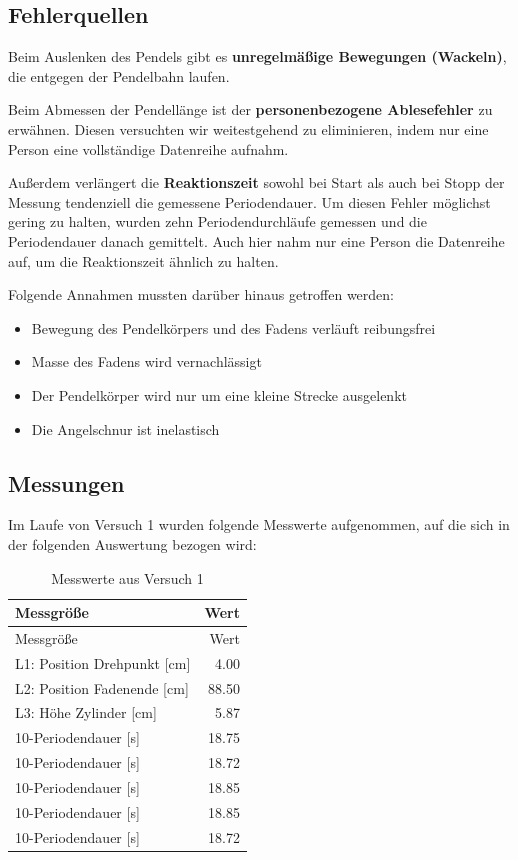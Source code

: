 \documentclass[
  9pt,
]{article}
\providecommand{\tightlist}{%
  \setlength{\itemsep}{0pt}\setlength{\parskip}{0pt}}
\begin{document}
\hypertarget{fehlerquellen}{%
\subsection{Fehlerquellen}\label{fehlerquellen}}

Beim Auslenken des Pendels gibt es \textbf{unregelmäßige Bewegungen
(Wackeln)}, die entgegen der Pendelbahn laufen.

Beim Abmessen der Pendellänge ist der \textbf{personenbezogene
Ablesefehler} zu erwähnen. Diesen versuchten wir weitestgehend zu
eliminieren, indem nur eine Person eine vollständige Datenreihe aufnahm.

Außerdem verlängert die \textbf{Reaktionszeit} sowohl bei Start als auch
bei Stopp der Messung tendenziell die gemessene Periodendauer. Um diesen
Fehler möglichst gering zu halten, wurden zehn Periodendurchläufe
gemessen und die Periodendauer danach gemittelt. Auch hier nahm nur eine
Person die Datenreihe auf, um die Reaktionszeit ähnlich zu halten.

Folgende Annahmen mussten darüber hinaus getroffen werden:

\begin{itemize}
\tightlist
\item
  Bewegung des Pendelkörpers und des Fadens verläuft reibungsfrei
\item
  Masse des Fadens wird vernachlässigt
\item
  Der Pendelkörper wird nur um eine kleine Strecke ausgelenkt
\item
  Die Angelschnur ist inelastisch
\end{itemize}

\hypertarget{messungen}{%
\subsection{Messungen}\label{messungen}}

Im Laufe von Versuch 1 wurden folgende Messwerte aufgenommen, auf die
sich in der folgenden Auswertung bezogen wird:

\begin{longtable}[]{@{}lr@{}}
\caption{Messwerte aus Versuch 1}\tabularnewline
\toprule
Messgröße & Wert \\
\midrule
\endfirsthead
\toprule
Messgröße & Wert \\
\midrule
\endhead
L1: Position Drehpunkt {[}cm{]} & 4.00 \\
L2: Position Fadenende {[}cm{]} & 88.50 \\
L3: Höhe Zylinder {[}cm{]} & 5.87 \\
10-Periodendauer {[}s{]} & 18.75 \\
10-Periodendauer {[}s{]} & 18.72 \\
10-Periodendauer {[}s{]} & 18.85 \\
10-Periodendauer {[}s{]} & 18.85 \\
10-Periodendauer {[}s{]} & 18.72 \\
\bottomrule
\end{longtable}
\end{document}
